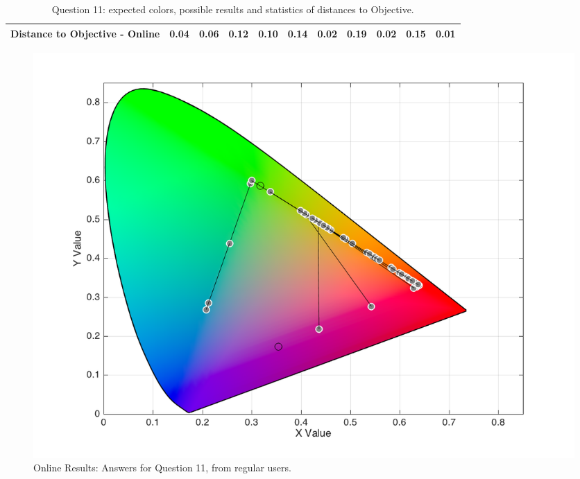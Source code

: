 \begin{table}[H]
{\begin{tabular}{lccccccccccccc}
    \multicolumn{4}{l}{Distance to Objective - Online}                                                                                               & \multicolumn{1}{|c}{\textbf{0.04}}        & \multicolumn{1}{c|}{0.06}    & \multicolumn{1}{|c}{0.12}        & \multicolumn{1}{c|}{0.10}    & \multicolumn{1}{|c}{0.14}       & \multicolumn{1}{c|}{0.02}    & \multicolumn{1}{|c}{0.19}        & \multicolumn{1}{c|}{0.02}    & \multicolumn{1}{|c}{0.15}       & \multicolumn{1}{c|}{0.01}    \\ \hline
    \end{tabular}}
  \caption[Question 11, with expected Results.]{Question 11: expected colors, possible results and statistics of distances to Objective.}
  \label{table:lab_q11_expected}
\end{table}
%
\begin{figure}[htbp]
  \centering
  \begin{minipage}{0.48\textwidth}
    \centering
    \includegraphics[width=\textwidth]{images/results/11_online_regularUsers.png}
    \caption[Online Results: Answers for Question 11, from regular users.]{Online Results: Answers for Question 11, from regular users.}
    \label{fig:onlineregular_11}
  \end{minipage}\hfill
  \begin{minipage}{0.48\textwidth}
    \centering

\end{minipage}
\end{figure}
